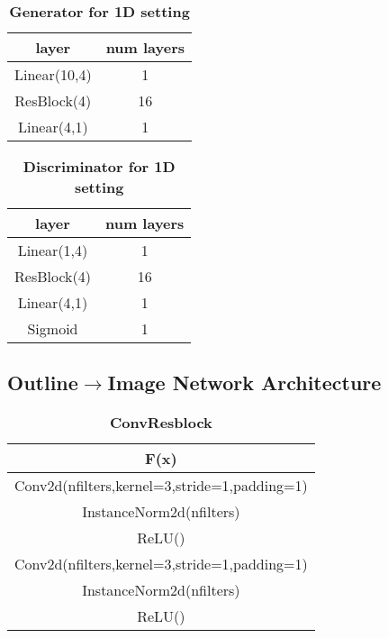 \begin{table}[ht]
\caption{\textbf{Generator for 1D setting}} %
\centering %
\begin{tabular}{c c} %
\hline\hline %
layer & num layers\\%
\hline %
Linear(10,4) & 1\\ %
ResBlock(4) & 16 \\
Linear(4,1) & 1 \\
\hline %
\end{tabular}
\label{table:1d_G} %
\end{table}

\begin{table}[ht]
\caption{\textbf{Discriminator for 1D setting}} %
\centering %
\begin{tabular}{c c} %
\hline\hline %
layer & num layers\\%
\hline %
Linear(1,4) & 1\\ %
ResBlock(4) & 16 \\
Linear(4,1) & 1 \\
Sigmoid & 1 \\
\hline %
\end{tabular}
\label{table:1d_D} %
\end{table}



\subsection{Outline$\rightarrow$Image Network Architecture}

\begin{table}[ht]
\caption{\textbf{ConvResblock}} %
\centering %
\begin{tabular}{c} %
\hline\hline %
F(x)\\%
\hline
Conv2d(nfilters,kernel=3,stride=1,padding=1) \\
InstanceNorm2d(nfilters)\\ %
ReLU() \\
Conv2d(nfilters,kernel=3,stride=1,padding=1) \\
InstanceNorm2d(nfilters)\\ %
ReLU() \\
\hline %
\end{tabular}
\label{table:convresblock} %
\end{table}


